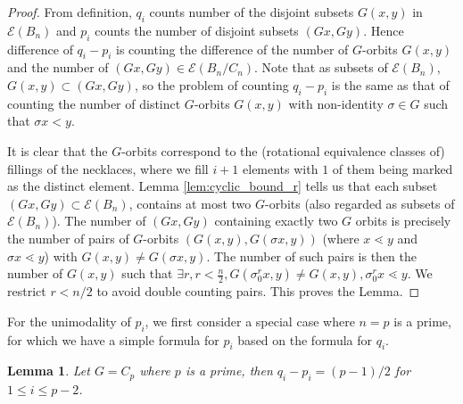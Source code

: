 \documentclass[10 pt]{amsart}
\theoremstyle{plain}
\newtheorem{lem}[thm]{Lemma}
\theoremstyle{definition}
\theoremstyle{remark}
\numberwithin{equation}{section}
\begin{document}
\begin{proof}
From definition, $q_i$ counts  number of the disjoint subsets $G(x, y)$ in $ \mathcal E (B_n)$ and $p_i$ counts the number of disjoint subsets $(Gx, Gy)$. Hence difference of $q_i - p_i$ is counting the difference of the number of $G$-orbits $G (x ,y)$ and the number of $(Gx,Gy) \in  \mathcal E(B_n/C_n)$.  Note that as subsets of $ \mathcal E (B_n)$, $G(x, y) \subset (Gx, Gy)$, so the problem of counting $q_i - p_i$ is the same as that of counting the number of distinct $G$-orbits $G(x , y)$  with non-identity $\sigma \in G$ such that $\sigma x < y$. 


It is clear that the $G$-orbits correspond to the (rotational equivalence classes of) fillings of the necklaces, where we fill $i+1$ elements with $1$ of them being marked as the distinct element. Lemma \ref{lem:cyclic_bound_r} tells us that each subset $(Gx, Gy) \subset  \mathcal E (B_n)$, contains at most two $G$-orbits (also regarded as subsets of $ \mathcal E (B_n)$). The number of $(Gx, Gy)$ containing exactly two $G$ orbits is precisely the number of pairs of $G$-orbits $(G (x, y),G(\sigma x, y ))$ (where $ x \lessdot y$ and $\sigma x \lessdot y$) with $G(x, y) \neq G(\sigma x, y).$ The number of such pairs is then the number of $G(x, y)$ such that $ \exists r,r<\frac n 2, G(\sigma_0^r x, y)\neq G(x, y),\sigma_0^r x \lessdot y.$ We restrict $r < n/2$ to avoid double counting pairs. This proves the Lemma.
\end{proof}

For the unimodality of $p_i$, we first consider a special case where $n = p$ is a prime, for which we have a simple formula for $p_i$ based on the formula for $q_i$.

\begin{lem}{\label{lem:cyclicprime}}
Let $G = C_p$ where $p$ is a prime, then $q_i - p_i = (p-1)/2$ for $ 1 \le i \le p-2$. 
\end{lem}
\end{document}
